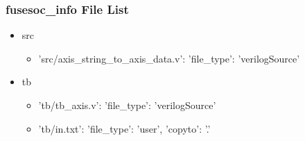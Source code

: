 \subsubsection{fusesoc\_info File List}
\begin{itemize}
\item src
	\begin{itemize}
	\item {'src/axis\_string\_to\_axis\_data.v': {'file\_type': 'verilogSource'}}
	\end{itemize}
\item tb
	\begin{itemize}
	\item {'tb/tb\_axis.v': {'file\_type': 'verilogSource'}}
	\item {'tb/in.txt': {'file\_type': 'user', 'copyto': '.'}}
	\end{itemize}
\end{itemize}
